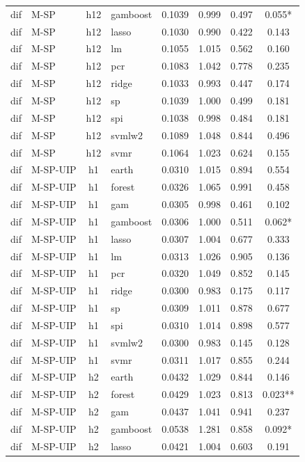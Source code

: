 \begin{ThreePartTable}
\begin{longtable}[t]{llclcccc}
dif & M-SP & h12 & gamboost & 0.1039 & 0.999 & 0.497 & 0.055*\\
dif & M-SP & h12 & lasso & 0.1030 & 0.990 & 0.422 & 0.143\\
dif & M-SP & h12 & lm & 0.1055 & 1.015 & 0.562 & 0.160\\
dif & M-SP & h12 & pcr & 0.1083 & 1.042 & 0.778 & 0.235\\
dif & M-SP & h12 & ridge & 0.1033 & 0.993 & 0.447 & 0.174\\
dif & M-SP & h12 & sp & 0.1039 & 1.000 & 0.499 & 0.181\\
dif & M-SP & h12 & spi & 0.1038 & 0.998 & 0.484 & 0.181\\
dif & M-SP & h12 & svmlw2 & 0.1089 & 1.048 & 0.844 & 0.496\\
dif & M-SP & h12 & svmr & 0.1064 & 1.023 & 0.624 & 0.155\\
\addlinespace
dif & M-SP-UIP & h1 & earth & 0.0310 & 1.015 & 0.894 & 0.554\\
dif & M-SP-UIP & h1 & forest & 0.0326 & 1.065 & 0.991 & 0.458\\
dif & M-SP-UIP & h1 & gam & 0.0305 & 0.998 & 0.461 & 0.102\\
dif & M-SP-UIP & h1 & gamboost & 0.0306 & 1.000 & 0.511 & 0.062*\\
dif & M-SP-UIP & h1 & lasso & 0.0307 & 1.004 & 0.677 & 0.333\\
dif & M-SP-UIP & h1 & lm & 0.0313 & 1.026 & 0.905 & 0.136\\
dif & M-SP-UIP & h1 & pcr & 0.0320 & 1.049 & 0.852 & 0.145\\
dif & M-SP-UIP & h1 & ridge & 0.0300 & 0.983 & 0.175 & 0.117\\
dif & M-SP-UIP & h1 & sp & 0.0309 & 1.011 & 0.878 & 0.677\\
dif & M-SP-UIP & h1 & spi & 0.0310 & 1.014 & 0.898 & 0.577\\
dif & M-SP-UIP & h1 & svmlw2 & 0.0300 & 0.983 & 0.145 & 0.128\\
dif & M-SP-UIP & h1 & svmr & 0.0311 & 1.017 & 0.855 & 0.244\\
\addlinespace
dif & M-SP-UIP & h2 & earth & 0.0432 & 1.029 & 0.844 & 0.146\\
dif & M-SP-UIP & h2 & forest & 0.0429 & 1.023 & 0.813 & 0.023**\\
dif & M-SP-UIP & h2 & gam & 0.0437 & 1.041 & 0.941 & 0.237\\
dif & M-SP-UIP & h2 & gamboost & 0.0538 & 1.281 & 0.858 & 0.092*\\
dif & M-SP-UIP & h2 & lasso & 0.0421 & 1.004 & 0.603 & 0.191\\

\end{longtable}
\end{ThreePartTable}

